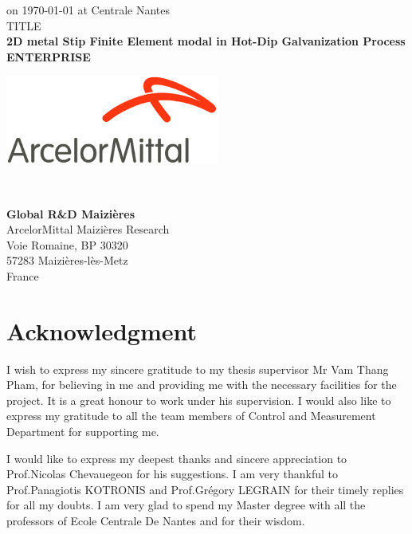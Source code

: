 \documentclass[12pt,twoside]{report}
\begin{document}
\begin{titlepage}
\begin{center}
\vspace{20mm}
on \today { at Centrale Nantes} \\
\vspace{10mm}
TITLE\\
\vspace{5mm}
\textbf{2D metal Stip Finite Element modal in Hot-Dip Galvanization Process}\\

\vspace{10mm}
{\textbf{ENTERPRISE}}


\begin{minipage}{0.45\textwidth}
\begin{flushright}
\includegraphics[width = 70mm]{images/ArcelorMittal_logo.png}
\end{flushright} 
\end{minipage}
~
\begin{minipage}{0.45\textwidth}
\begin{flushleft}
\textbf{Global R\&D Maizières } \\
ArcelorMittal Maizières Research \\
Voie Romaine, BP 30320 \\
57283 Maizières-lès-Metz\\
France
\end{flushleft} 
\end{minipage}
\end{center}
\end{titlepage}

\thispagestyle{empty}
\chapter*{Acknowledgment}
I  wish to express my sincere gratitude to my thesis supervisor Mr Vam Thang Pham, for believing in me and providing me with the necessary facilities for the project. It is a great honour to work under his supervision. I would also like to express my gratitude to all the team members of Control and Measurement Department for supporting me.

I would like to express my deepest thanks and sincere appreciation to Prof.Nicolas Chevauegeon for his suggestions. I am very thankful to Prof.Panagiotis KOTRONIS and Prof.Grégory LEGRAIN for their timely replies for all my doubts. I am very glad to spend my Master degree with all the professors of Ecole Centrale De Nantes and for their wisdom.
\end{document}
